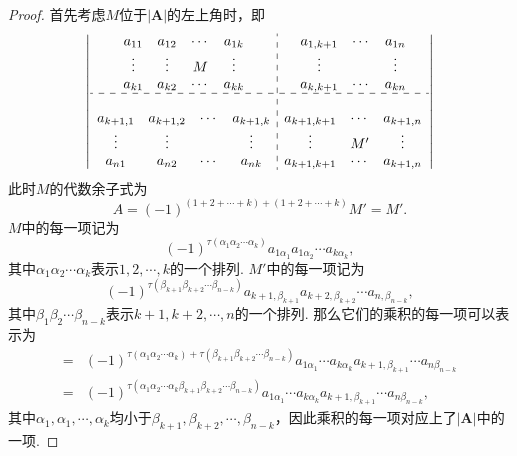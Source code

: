 \documentclass{article}
\newcommand{\mbf}[1]{\mathbf{#1}}
\begin{document}
\begin{proof}
首先考虑$M$位于$|\mbf{A}|$的左上角时，即
$$
\left|
\begin{array}{c:c}
\begin{matrix}
a_{11} & a_{12} & \cdots & a_{1k} \\
\vdots & \vdots & M & \vdots \\
a_{k1} & a_{k2} & \cdots & a_{kk} 
\end{matrix} &
\begin{matrix}
a_{1,k+1} & \cdots  & a_{1n} \\ 
\vdots &  & \vdots \\
a_{k,k+1} &  \cdots & a_{kn} 
\end{matrix} \\
\hdashline \\
\begin{matrix}
a_{k+1,1} & a_{k+1,2} & \cdots & a_{k+1,k} \\
\vdots & \vdots &  & \vdots \\
a_{n1} & a_{n2} & \cdots & a_{nk} 
\end{matrix} &
\begin{matrix}
a_{k+1,k+1} & \cdots  & a_{k+1,n} \\ 
\vdots & M' & \vdots \\
a_{k+1,k+1} &  \cdots & a_{k+1,n} 
\end{matrix} \\
\end{array} \right|
$$
此时$M$的代数余子式为
$$
A = (-1)^{(1+2+\cdots+k) + (1+2+\cdots+k)}M' = M'.
$$
$M$中的每一项记为
$$
(-1)^{\tau(\alpha_1\alpha_2\cdots\alpha_k)}a_{1\alpha_1}a_{1\alpha_2}\cdots a_{k\alpha_k},
$$
其中$\alpha_1\alpha_2\cdots\alpha_k$表示$1,2,\cdots,k$的一个排列.
$M'$中的每一项记为
$$
(-1)^{\tau(\beta_{k+1}\beta_{k+2}\cdots\beta_{n-k})}a_{k+1,\beta_{k+1}}a_{k+2,\beta_{k+2}}\cdots a_{n,\beta_{n-k}},
$$
其中$\beta_1\beta_2\cdots\beta_{n-k}$表示$k+1,k+2,\cdots,n$的一个排列. 那么它们的乘积的每一项可以表示为
$$
\begin{array}{ll}
=&(-1)^{\tau(\alpha_1\alpha_2\cdots\alpha_k) + \tau(\beta_{k+1}\beta_{k+2}\cdots\beta_{n-k})} a_{1\alpha_1}\cdots a_{k\alpha_k}a_{k+1,\beta_{k+1}}\cdots a_{n\beta_{n-k}} \\
=&(-1)^{\tau(\alpha_1\alpha_2\cdots\alpha_k\beta_{k+1}\beta_{k+2}\cdots\beta_{n-k})} a_{1\alpha_1}\cdots a_{k\alpha_k}a_{k+1,\beta_{k+1}}\cdots a_{n\beta_{n-k}},
\end{array}
$$
其中$\alpha_1,\alpha_1,\cdots,\alpha_k$均小于$\beta_{k+1},\beta_{k+2},\cdots,\beta_{n-k}$，因此乘积的每一项对应上了$|\mbf{A}|$中的一项. 


\end{proof}
\end{document}
